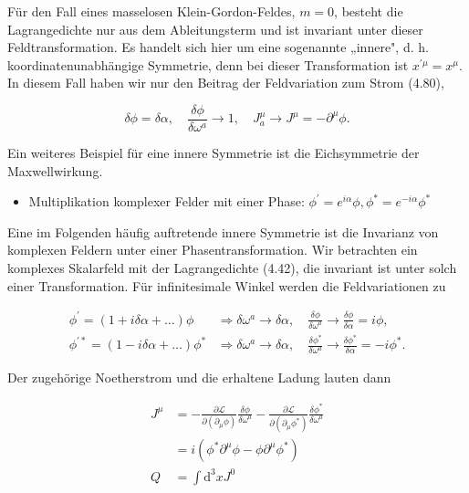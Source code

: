 \documentclass[10pt, letterpaper]{article}
\begin{document}
Für den Fall eines masselosen Klein-Gordon-Feldes, $m=0$, besteht die Lagrangedichte nur aus dem Ableitungsterm und ist invariant unter dieser Feldtransformation. Es handelt sich hier um eine sogenannte „innere", d. h. koordinatenunabhängige Symmetrie, denn bei dieser Transformation ist $x^{\prime \mu}=x^{\mu}$. In diesem Fall haben wir nur den Beitrag der Feldvariation zum Strom (4.80),

$$
\delta \phi=\delta \alpha, \quad \frac{\delta \phi}{\delta \omega^{a}} \rightarrow 1, \quad J_{a}^{\mu} \rightarrow J^{\mu}=-\partial^{\mu} \phi .
$$

Ein weiteres Beispiel für eine innere Symmetrie ist die Eichsymmetrie der Maxwellwirkung.

\begin{itemize}
  \item Multiplikation komplexer Felder mit einer Phase: $\phi^{\prime}=e^{i \alpha} \phi, \phi^{*}=e^{-i \alpha} \phi^{*}$
\end{itemize}

Eine im Folgenden häufig auftretende innere Symmetrie ist die Invarianz von komplexen Feldern unter einer Phasentransformation. Wir betrachten ein komplexes Skalarfeld mit der Lagrangedichte (4.42), die invariant ist unter solch einer Transformation. Für infinitesimale Winkel werden die Feldvariationen zu

$$
\begin{aligned}
\phi^{\prime}=(1+i \delta \alpha+\ldots) \phi \quad & \Rightarrow \delta \omega^{a} \rightarrow \delta \alpha, \quad \frac{\delta \phi}{\delta \omega^{a}} \rightarrow \frac{\delta \phi}{\delta \alpha}=i \phi, \\
\phi^{\prime *}=(1-i \delta \alpha+\ldots) \phi^{*} & \Rightarrow \delta \omega^{a} \rightarrow \delta \alpha, \quad \frac{\delta \phi^{*}}{\delta \omega^{a}} \rightarrow \frac{\delta \phi^{*}}{\delta \alpha}=-i \phi^{*} .
\end{aligned}
$$

Der zugehörige Noetherstrom und die erhaltene Ladung lauten dann

$$
\begin{aligned}
J^{\mu} & =-\frac{\partial \mathscr{L}}{\partial\left(\partial_{\mu} \phi\right)} \frac{\delta \phi}{\delta \omega^{a}}-\frac{\partial \mathscr{L}}{\partial\left(\partial_{\mu} \phi^{*}\right)} \frac{\delta \phi^{*}}{\delta \omega^{a}} \\
& =i\left(\phi^{*} \partial^{\mu} \phi-\phi \partial^{\mu} \phi^{*}\right) \\
Q & =\int \mathrm{d}^{3} x J^{0}
\end{aligned}
$$
\end{document}

